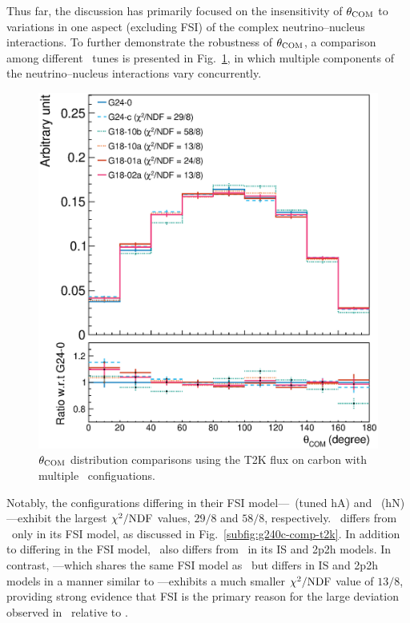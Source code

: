      Thus far, the discussion has primarily focused on the insensitivity of $\theta_{\textrm{COM}}$ to variations in one aspect (excluding FSI) of the complex neutrino–nucleus interactions.
     To further demonstrate the robustness of $\theta_{\textrm{COM}}$, a comparison among different \genie\ tunes is presented in Fig.~\ref{fig:mod-comp}, in which multiple components of the neutrino–nucleus interactions vary concurrently.
     \begin{figure}[ht!]
          \centering
          \includegraphics[width=\scfigwid\textwidth]{figures/COM/anorm-mod-ratio_da_tan.eps}
     \caption{$\theta_{\textrm{COM}}$ distribution comparisons using the T2K flux on carbon with multiple \genie\ configuations. }
     \label{fig:mod-comp}
     \end{figure}

     Notably, the configurations differing in their FSI model—\gC\ (tuned hA) and \getb\ (hN)—exhibit the largest $\chi^2/{\textrm{NDF}}$ values, $29/8$ and $58/8$, respectively.
     \gC\ differs from \gZero\ only in its FSI model, as discussed in Fig.~\ref{subfig:g240c-comp-t2k}.
     In addition to differing in the FSI model, \getb\ also differs from \gZero\ in its IS and 2p2h models.
     In contrast, \geta—which shares the same FSI model as \gZero\ but differs in IS and 2p2h models in a manner similar to \getb—exhibits a much smaller $\chi^2/{\textrm{NDF}}$ value of $13/8$, providing strong evidence that FSI is the primary reason for the large deviation observed in \getb\ relative to \gZero.

